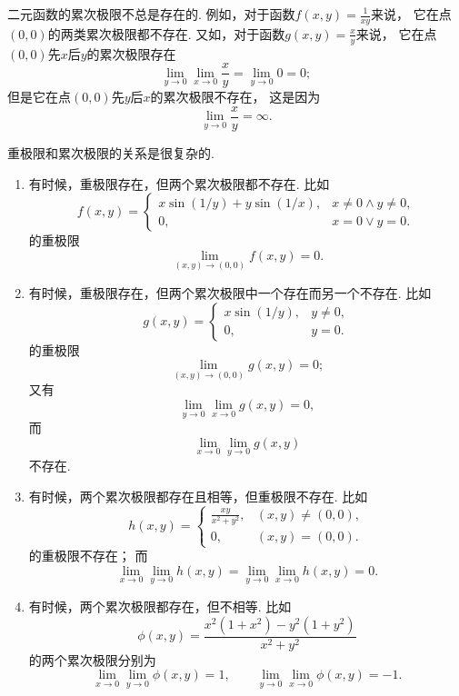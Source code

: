 二元函数的累次极限不总是存在的.
例如，对于函数\(f(x,y)=\frac{1}{xy}\)来说，
它在点\((0,0)\)的两类累次极限都不存在.
又如，对于函数\(g(x,y)=\frac{x}{y}\)来说，
它在点\((0,0)\)先\(x\)后\(y\)的累次极限存在\[
	\lim_{y\to0}\lim_{x\to0}\frac{x}{y}
	=\lim_{y\to0}0
	=0;
\]
但是它在点\((0,0)\)先\(y\)后\(x\)的累次极限不存在，
这是因为\[
	\lim_{y\to0}\frac{x}{y}=\infty.
\]

\begin{example}
重极限和累次极限的关系是很复杂的.
\begin{enumerate}
	\item 有时候，重极限存在，但两个累次极限都不存在.
	比如\[
		f(x,y) = \left\{ \begin{array}{cl}
			x \sin(1/y) + y \sin(1/x), & x\neq0 \land y\neq0, \\
			0, & x=0 \lor y=0.
		\end{array} \right.
	\]的重极限\[
		\lim_{(x,y)\to(0,0)} f(x,y) = 0.
	\]

	\item 有时候，重极限存在，但两个累次极限中一个存在而另一个不存在.
	比如\[
		g(x,y) = \left\{ \begin{array}{cl}
			x \sin(1/y), & y\neq0, \\
			0, & y=0.
		\end{array} \right.
	\]的重极限\[
		\lim_{(x,y)\to(0,0)} g(x,y) = 0;
	\]
	又有\[
		\lim_{y\to0} \lim_{x\to0} g(x,y) = 0,
	\]
	而\[
		\lim_{x\to0} \lim_{y\to0} g(x,y)
	\]不存在.

	\item 有时候，两个累次极限都存在且相等，但重极限不存在.
	比如\[
		h(x,y) = \left\{ \begin{array}{cl}
			\frac{xy}{x^2+y^2}, & (x,y)\neq(0,0), \\
			0, & (x,y)=(0,0).
		\end{array} \right.
	\]的重极限不存在；
	而\[
		\lim_{x\to0} \lim_{y\to0} h(x,y)
		= \lim_{y\to0} \lim_{x\to0} h(x,y) = 0.
	\]

	\item 有时候，两个累次极限都存在，但不相等.
	比如\[
		\phi(x,y) = \frac{x^2(1+x^2) - y^2(1+y^2)}{x^2+y^2}
	\]的两个累次极限分别为\[
		\lim_{x\to0} \lim_{y\to0} \phi(x,y) = 1,
		\qquad
		\lim_{y\to0} \lim_{x\to0} \phi(x,y) = -1.
	\]
\end{enumerate}
\end{example}

